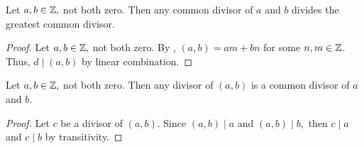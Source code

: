 \documentclass{ximera}
\begin{document}
\begin{lemma}\label{lem:gcd_mult}
	Let $a,b\in\mathbb Z,$ not both zero. Then any  common divisor of $a$ and $b$ divides the greatest common divisor.

 	\begin{proof}
 		Let $a,b\in\mathbb Z,$ not both zero. By , $(a,b)=am+bn$ for some $n,m\in\mathbb Z$. Thus, $d\mid (a,b)$ by linear combination.
 	\end{proof}
\end{lemma}


\begin{lemma}\label{lem:gcd_trans}
 	Let $a,b\in\mathbb Z,$ not both zero. Then any divisor of $(a,b)$ is a common divisor of $a$ and $b$.

	\begin{proof}
 		Let $c$ be a divisor of $(a,b)$. Since $(a,b)\mid a$ and $(a,b )\mid b,$ then $c\mid a$ and $c\mid b$ by transitivity.
	\end{proof}
\end{lemma}

\end{document}
